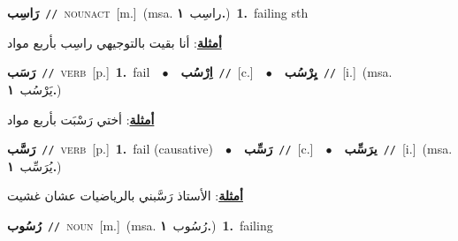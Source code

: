 \documentclass[10pt,a4paper,twoside]{article} %
\begin{document}
\begin{multicols}{2}
{\setlength\topsep{0pt}\textbf{\foreignlanguage{arabic}{رَاسِب}}\ {\color{gray}\texttt{//}\color{black}}\ \textsc{noun\textunderscore act}\ [m.]\ \color{gray}(msa. \foreignlanguage{arabic}{راسِب}~\foreignlanguage{arabic}{\textbf{١.}})\color{black}\ \textbf{1.}~failing sth\  \begin{flushright}\color{gray}\foreignlanguage{arabic}{\textbf{\underline{\foreignlanguage{arabic}{أمثلة}}}: أنا بقيت بالتوجيهي راسِب بأربع مواد}\end{flushright}\color{black}} \vspace{2mm}

{\setlength\topsep{0pt}\textbf{\foreignlanguage{arabic}{رَسَب}}\ {\color{gray}\texttt{//}\color{black}}\ \textsc{verb}\ [p.]\ \textbf{1.}~fail\ \ $\bullet$\ \ \setlength\topsep{0pt}\textbf{\foreignlanguage{arabic}{اِرْسُب}}\ {\color{gray}\texttt{//}\color{black}}\ [c.]\ \ $\bullet$\ \ \setlength\topsep{0pt}\textbf{\foreignlanguage{arabic}{يِرْسُب}}\ {\color{gray}\texttt{//}\color{black}}\ [i.]\ \color{gray}(msa. \foreignlanguage{arabic}{يَرْسُب}~\foreignlanguage{arabic}{\textbf{١.}})\color{black}\  \begin{flushright}\color{gray}\foreignlanguage{arabic}{\textbf{\underline{\foreignlanguage{arabic}{أمثلة}}}: أختي رَسْبَت بأربع مواد}\end{flushright}\color{black}} \vspace{2mm}

{\setlength\topsep{0pt}\textbf{\foreignlanguage{arabic}{رَسَّب}}\ {\color{gray}\texttt{//}\color{black}}\ \textsc{verb}\ [p.]\ \textbf{1.}~fail (causative)\ \ $\bullet$\ \ \setlength\topsep{0pt}\textbf{\foreignlanguage{arabic}{رَسِّب}}\ {\color{gray}\texttt{//}\color{black}}\ [c.]\ \ $\bullet$\ \ \setlength\topsep{0pt}\textbf{\foreignlanguage{arabic}{يرَسِّب}}\ {\color{gray}\texttt{//}\color{black}}\ [i.]\ \color{gray}(msa. \foreignlanguage{arabic}{يُرَسِّب}~\foreignlanguage{arabic}{\textbf{١.}})\color{black}\  \begin{flushright}\color{gray}\foreignlanguage{arabic}{\textbf{\underline{\foreignlanguage{arabic}{أمثلة}}}: الأستاذ رَسَّبني بالرياضيات عشان غشيت}\end{flushright}\color{black}} \vspace{2mm}

{\setlength\topsep{0pt}\textbf{\foreignlanguage{arabic}{رُسُوب}}\ {\color{gray}\texttt{//}\color{black}}\ \textsc{noun}\ [m.]\ \color{gray}(msa. \foreignlanguage{arabic}{رُسُوب}~\foreignlanguage{arabic}{\textbf{١.}})\color{black}\ \textbf{1.}~failing\ } \vspace{2mm}


\end{multicols}
\end{document}
